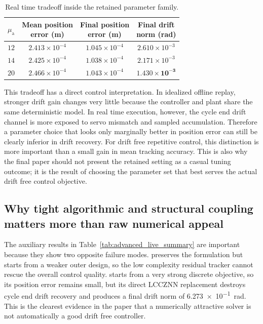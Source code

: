 \begin{table}[H]
  \centering
  \caption{Real time tradeoff inside the retained \methodtwoDL{} parameter family.}
  \label{tab:m2_tuning_tradeoff}
  \small
  \setlength{\tabcolsep}{4pt}
  \renewcommand{\arraystretch}{1.08}
  \begin{tabular}{@{}cccc@{}}
    \toprule
    $\mu_{\mathrm{a}}$ &
    \shortstack[c]{Mean position\\error (m)} &
    \shortstack[c]{Final position\\error (m)} &
    \shortstack[c]{Final drift\\norm (rad)} \\
    \midrule
    $12$ &
    $2.413\times 10^{-4}$ &
    $1.045\times 10^{-4}$ &
    $2.610\times 10^{-3}$ \\
    $14$ &
    $2.425\times 10^{-4}$ &
    $1.038\times 10^{-4}$ &
    $2.171\times 10^{-3}$ \\
    $20$ &
    $2.466\times 10^{-4}$ &
    $1.043\times 10^{-4}$ &
    $\mathbf{1.430\times 10^{-3}}$ \\
    \bottomrule
  \end{tabular}
\end{table}

This tradeoff has a direct control interpretation. In idealized offline replay, stronger drift gain changes very little because the controller and plant share the same deterministic model. In real time execution, however, the cycle end drift channel is more exposed to servo mismatch and sampled accumulation. Therefore a parameter choice that looks only marginally better in position error can still be clearly inferior in drift recovery. For drift free repetitive control, this distinction is more important than a small gain in mean tracking accuracy. This is also why the final paper should not present the retained setting as a casual tuning outcome; it is the result of choosing the parameter set that best serves the actual drift free control objective.

\subsection{Why tight algorithmic and structural coupling matters more than raw numerical appeal}

The auxiliary results in Table~\ref{tab:advanced_live_summary} are important because they show two opposite failure modes. \methodoneDL{} preserves the formulation but starts from a weaker outer design, so the low complexity residual tracker cannot rescue the overall control quality. \methodthreelcc{} starts from a very strong discrete objective, so its position error remains small, but its direct LCCZNN replacement destroys cycle end drift recovery and produces a final drift norm of \SI{6.273e-1}{\radian}. This is the clearest evidence in the paper that a numerically attractive solver is not automatically a good drift free controller.

